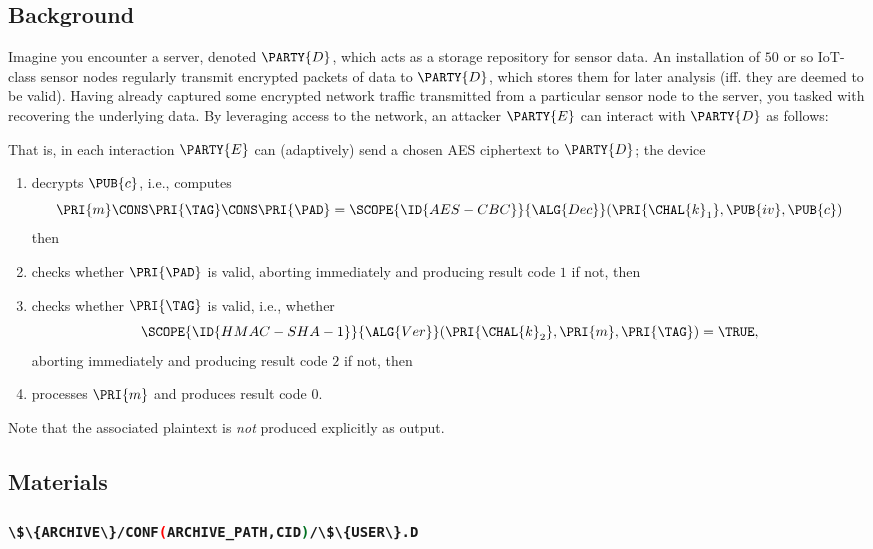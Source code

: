 \documentclass[crop={false},multi={true},tikz={true}]{standalone}
\begin{document}

\subsection{Background}

Imagine you encounter a server, denoted $\PARTY{D}$, 
which acts as a storage repository for sensor data.  An installation of $50$ 
or so IoT-class sensor nodes regularly transmit encrypted packets of data to
$\PARTY{D}$, which stores them for later analysis (iff. they are deemed to be
valid).  Having already captured some encrypted network traffic transmitted 
from a particular sensor node to the server, you tasked with recovering the 
underlying data.
By leveraging access to the network, 
an attacker $\PARTY{E}$ can interact with $\PARTY{D}$ as follows:

\begin{center}

\end{center}

\noindent
That is, in each interaction $\PARTY{E}$ can (adaptively) send 
a chosen AES ciphertext
to $\PARTY{D}$; the device

\begin{enumerate}
\item decrypts $\PUB{c}$, i.e., computes
      \[
      \PRI{m} \CONS \PRI{\TAG} \CONS \PRI{\PAD} = \SCOPE{\ID{AES-CBC}}{\ALG{Dec}}( \PRI{\CHAL{k}_1}, \PUB{iv}, \PUB{c} )
      \]
      then
\item checks whether $\PRI{\PAD}$ is valid, 
      aborting immediately  and producing result code $1$ if not,
      then
\item checks whether $\PRI{\TAG}$ is valid, i.e., whether 
      \[
      \SCOPE{\ID{HMAC-SHA-1}}{\ALG{Ver}}( \PRI{\CHAL{k}_2}, \PRI{m}, \PRI{\TAG} ) = \TRUE ,
      \]
      aborting immediately  and producing result code $2$ if not,
      then
\item processes $\PRI{m}$
                            and produces  result code $0$.
\end{enumerate}

\noindent
Note that the associated  plaintext is {\em not} produced explicitly as
output.

\subsection{Materials}

\subsubsection{\lstinline[language={bash}]|\$\{ARCHIVE\}/CONF(ARCHIVE_PATH,CID)/\$\{USER\}.D|}
\end{document}
